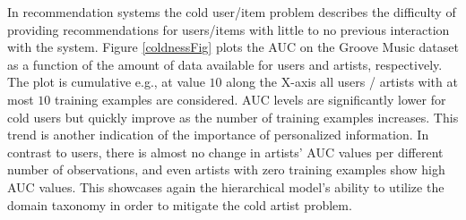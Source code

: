


In recommendation systems the cold  user/item problem describes the difficulty of
providing recommendations for users/items with little to no previous interaction with the system. 
Figure \ref{coldnessFig} plots the AUC on the Groove Music dataset as a function of the amount of data available for users and artists, respectively. The plot is cumulative e.g., at value $10$ along the X-axis all users / artists with at most $10$ training examples are considered. AUC levels are significantly lower for cold users but quickly improve as the number of training examples increases. This trend is another indication of the importance of personalized information. In contrast to users, there is almost no change in artists' AUC values per different number of observations, and even artists with zero training examples show high AUC values.
This showcases again the hierarchical model's ability to utilize the domain taxonomy in order to mitigate the cold artist problem. %



